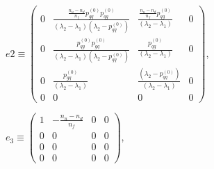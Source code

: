 \documentclass[review]{elsarticle}
\begin{document}
\begin{center}
$e2\equiv\left(\begin{array}{cccc}
0 & \frac{\frac{n_{u}-n_{d}}{n_{f}}p_{gq}^{(0)}p_{qg}^{(0)}}{(\lambda_{2}-\lambda_{1})(\lambda_{2}-p_{qq}^{(0)})} & \frac{\frac{n_{u}-n_{d}}{n_{f}}p_{qg}^{(0)}}{(\lambda_{2}-\lambda_{1})} & 0\\
0 & \frac{p_{qg}^{(0)}p_{gq}^{(0)}}{(\lambda_{2}-\lambda_{1})(\lambda_{2}-p_{qq}^{(0)})} & \frac{p_{qg}^{(0)}}{(\lambda_{2}-\lambda_{1})} & 0\\
0 & \frac{p_{gq}^{(0)}}{(\lambda_{2}-\lambda_{1})} & \frac{(\lambda_{2}-p_{qq}^{(0)})}{(\lambda_{2}-\lambda_{1})} & 0\\
0 & 0 & 0 & 0
\end{array}\right)$,
\par\end{center}

\begin{center}
$e_{3}\equiv\left(\begin{array}{cccc}
1 & -\frac{n_{u}-n_{d}}{n_{f}} & 0 & 0\\
0 & 0 & 0 & 0\\
0 & 0 & 0 & 0\\
0 & 0 & 0 & 0
\end{array}\right)$,
\par\end{center}
\end{document}
